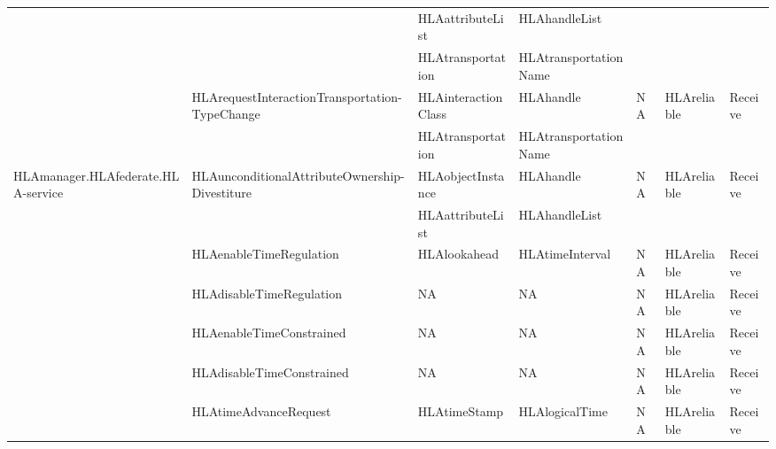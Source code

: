 \begin{landscape}
\begin{momtabletypeset}[8.00]
{{\begin{tabular}{|Y{116.92pt}|Y{137.54pt}|Y{76.22pt}|Y{103.88pt}|Y{65.90pt}|Y{66.32pt}|Y{38.52pt}|}
                    &                                                         & HLAattributeList    & HLAhandleList         &    &             &         \\
                    &                                                         & HLAtransportation   & HLAtransportationName &    &             &         \\
                    & HLArequestInteractionTransportation-\newline TypeChange & HLAinteractionClass & HLAhandle & NA & HLAreliable & Receive \\
                    &                                                         & HLAtransportation   & HLAtransportationName &    &             &         \\
                    \hline
                    HLAmanager.\allowbreak{}HLAfederate.\allowbreak{}HLA-\newline service & HLAunconditionalAttributeOwnership-\newline Divestiture & HLAobjectInstance & HLAhandle & NA & HLAreliable & Receive \\
                    &                                                         & HLAattributeList    & HLAhandleList         &    &             &         \\
                    & HLAenableTimeRegulation                                 & HLAlookahead        & HLAtimeInterval       & NA & HLAreliable & Receive \\
                    & HLAdisableTimeRegulation                                & NA                  & NA                    & NA & HLAreliable & Receive \\
                    & HLAenableTimeConstrained                                & NA                  & NA                    & NA & HLAreliable & Receive \\
                    & HLAdisableTimeConstrained                               & NA                  & NA                    & NA & HLAreliable & Receive \\
                    & HLAtimeAdvanceRequest                                   & HLAtimeStamp        & HLAlogicalTime        & NA & HLAreliable & Receive \\

\end{tabular}}}
\end{momtabletypeset}
\end{landscape}
